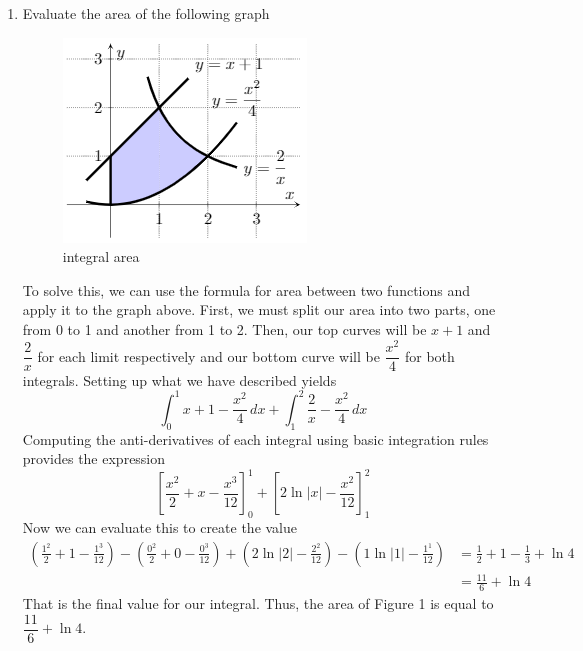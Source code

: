 \documentclass{article}
\begin{document}
\begin{enumerate}[label=\textbf{(7.\arabic*)}]


	\item Evaluate the area of the following graph
	\begin{figure}[H]
		\centering
		\includegraphics[scale=.75]{triginta}
		\caption{integral area}
	\end{figure}

To solve this, we can use the formula for area between two functions and apply it to the graph above. First, we must split our area into two parts, one from 0 to 1 and another from 1 to 2. Then, our top curves will be $x+1$ and $\dfrac{2}{x}$ for each limit respectively and our bottom curve will be $\dfrac{x^2}{4}$ for both integrals. Setting up what we have described yields
\[\int_0^1\!x+1-\frac{x^2}{4}\,dx+\int_1^2\!\frac{2}{x}-\frac{x^2}{4}\,dx\]
Computing the anti-derivatives of each integral using basic integration rules provides the expression
\[\left[\frac{x^2}{2}+x-\frac{x^3}{12}\right]_0^1+\left[2\ln|x|-\frac{x^2}{12}\right]_1^2\]
Now we can evaluate this to create the value
\begin{align*}
\left(\frac{1^2}{2}+1-\frac{1^3}{12}\right)-\left(\frac{0^2}{2}+0-\frac{0^3}{12}\right)+\left(2\ln|2|-\frac{2^2}{12}\right)-\left(1\ln|1|-\frac{1^1}{12}\right) &= \frac{1}{2}+1-\frac{1}{3}+\ln4 \\
&= \frac{11}{6}+\ln4
\end{align*}
That is the final value for our integral. Thus, the area of Figure 1 is equal to $\dfrac{11}{6}+\ln4$.

\newpage


\end{enumerate}
\end{document}
